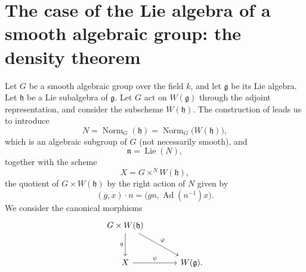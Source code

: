 
\section{The case of the Lie algebra of a smooth algebraic group:
the density theorem}

Let \(G\) be a smooth algebraic group over the field \(k\), and let
\(\mathfrak g\) be its Lie algebra. Let \(\mathfrak h\) be a Lie
subalgebra of \(\mathfrak g\). Let \(G\) act on \(W(\mathfrak g)\)
through the adjoint representation, and consider the subscheme
\(W(\mathfrak h)\). The construction of  leads us to introduce
\[
  N=\operatorname{Norm}_G(\mathfrak h)
   =\operatorname{Norm}_G\bigl(W(\mathfrak h)\bigr),
\]
which is an algebraic subgroup of \(G\) (not necessarily smooth), and
\[
  \mathfrak n=\operatorname{Lie}(N),
\]
together with the scheme
\[
  X=G\times^N W(\mathfrak h),
\]
the quotient of \(G\times W(\mathfrak h)\) by the right
action of \(N\) given by
\[
  (g,x)\cdot n=\bigl(gn,\operatorname{Ad}(n^{-1})x\bigr).
\]
We consider the canonical morphisms
\[
\begin{tikzcd}[column sep=large,row sep=large]
G\times W(\mathfrak h)
  \arrow[d,"q"']
  \arrow[dr,"\varphi"] & \\
X \arrow[r,"\psi"] & W(\mathfrak g).
\end{tikzcd}
\]

